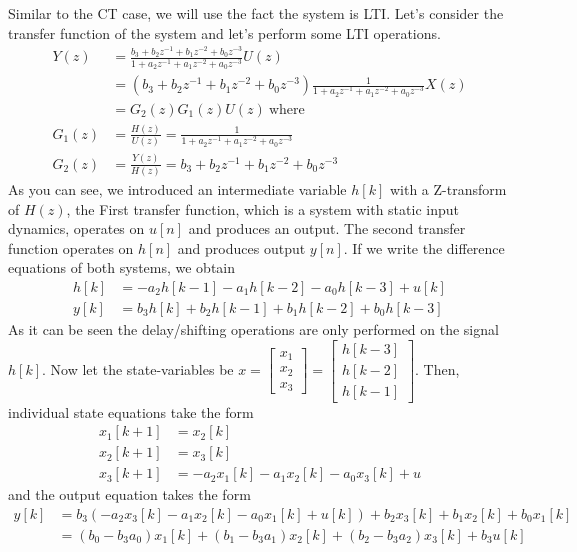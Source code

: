 \documentclass[twoside]{article}
\begin{document}
Similar to the CT case, we will use the fact the system is
LTI. Let's consider the transfer function of the system and let's 
perform some LTI operations.
%
\begin{align*}
Y(z) &= \frac{b_3 + b_2 z^{-1} + b_1 z^{-2} + b_0 z^{-3}}{1+ a_2
       z^{-1} + a_1 z^{-2} + a_0 z^{-3}} U(z)
\\
&= \left( b_3 + b_2 z^{-1} + b_1 z^{-2} + b_0 z^{-3} \right) \frac{1}{1+ a_2
       z^{-1} + a_1 z^{-2} + a_0 z^{-3}} X(z) 
\\
&= G_2(z) G_1(z) U(z) \ \mathrm{where} 
\\
G_1(z) &= \frac{H(z)}{U(z)} = \frac{1}{1+ a_2
       z^{-1} + a_1 z^{-2} + a_0 z^{-3}} 
\\
G_2(z) &= \frac{Y(z)}{H(z)} = b_3 + b_2 z^{-1} + b_1 z^{-2} + b_0 z^{-3} 
\end{align*}
%
As you can see, we introduced an intermediate variable $h[k]$ with a
Z-transform of $H(z)$, the First transfer function, which is a system
with static input dynamics, operates on $u[n]$ and produces an output. 
The second transfer function operates on $h[n]$ and produces output
$y[n]$. If we write the difference equations of both systems, we obtain
%
\begin{align*}
h[k] &= -a_2 h[k-1] - a_1 h[k-2] - a_0 h[k-3] + u[k] 
\\
y[k] &= b_3 h[k] + b_2 h[k-1] + b_1 h[k-2] + b_0 h[k-3] 
\end{align*}
%
As it can be seen the delay/shifting operations are only
performed on the signal $h[k]$. Now let the state-variables be 
$x = \left[ \begin{array}{c} x_1 \\ x_2 \\ x_3 \end{array} \right] 
= \left[ \begin{array}{c} h[k-3] \\ h[k-2] \\ h[k-1]\end{array} \right]$. Then,
individual state equations take the form
%
\begin{align*}
x_1[k+1] &= x_2[k]
\\
x_2[k+1] &= x_3[k]
\\
x_3[k+1] &= -a_2 x_1[k] - a_1 x_2[k] - a_0 x_3[k] + u
\end{align*}
%
and the output equation takes the form
%
\begin{align*}
y[k] &= b_3\left( -a_2 x_3[k] - a_1 x_2[k] - a_0 x_1[k] + u[k] \right) + b_2 x_3[k] +
    b_1 x_2[k] + b_0 x_1[k]
\\
&= ( b_0 - b_3 a_0 ) x_1[k] + ( b_1 - b_3 a_1 ) x_2[k] + ( b_2 - b_3 a_2 ) x_3[k] + b_3 u[k]
\end{align*}
\end{document}
